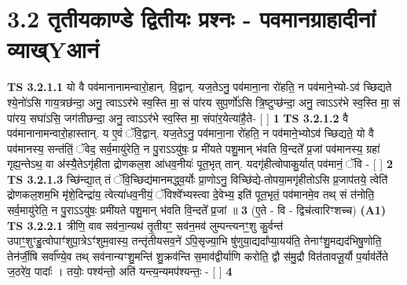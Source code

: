 \documentclass[17pt]{extarticle}
\begin{document}
     \section*{ 3.2     तृतीयकाण्डे द्वितीयः प्रश्नः - पवमानग्राहादीनां व्याख्Yआनं }
                                        \textbf{ TS 3.2.1.1} \newline
                  यो वै पव॑मानानामन्वारो॒हान्. वि॒द्वान्. यज॒तेऽनु॒ पव॑माना॒ना रो॑हति॒ न पव॑माने॒भ्यो-ऽव॑ च्छिद्यते श्ये॒नो॑ऽसि गाय॒त्रछ॑न्दा॒ अनु॒ त्वाऽऽर॑भे स्व॒स्ति मा॒ सं पा॑रय सुप॒र्णो॑ऽसि त्रि॒ष्टुप्छ॑न्दा॒ अनु॒ त्वाऽऽर॑भे स्व॒स्ति मा॒ सं पा॑रय॒ सघा॑ऽसि॒ जग॑तीछन्दा॒ अनु॒ त्वाऽऽर॑भे स्व॒स्ति मा॒ संपा॑र॒येत्या॑है॒ते- [  ] \textbf{  1} \newline
                  \newline
                                \textbf{ TS 3.2.1.2} \newline
                  वै पव॑मानानामन्वारो॒हास्तान्. य ए॒वं ॅवि॒द्वान्. यज॒तेऽनु॒ पव॑माना॒ना रो॑हति॒ न पव॑माने॒भ्योऽव॑ च्छिद्यते॒ यो वै पव॑मानस्य॒ सन्त॑तिं॒ ॅवेद॒ सर्व॒मायु॑रेति॒ न पु॒राऽऽयु॑षः॒ प्र मी॑यते पशु॒मान् भ॑वति वि॒न्दते᳚ प्र॒जां पव॑मानस्य॒ ग्रहा॑ गृह्य॒न्तेऽथ॒ वा अ॑स्यै॒तेऽगृ॑हीता द्रोणकल॒श आ॑धव॒नीयः॑ पूत॒भृत् तान्. यदगृ॑हीत्वोपाकु॒र्यात् पव॑मानं॒ ॅवि - [  ] \textbf{  2} \newline
                  \newline
                                \textbf{ TS 3.2.1.3} \newline
                  च्छि॑न्द्या॒त् तं ॅवि॒च्छिद्य॑मानमद्ध्व॒र्योः प्रा॒णोऽनु॒ विच्छि॑द्ये-तोपया॒मगृ॑हीतोऽसि प्र॒जाप॑तये॒ त्वेति॑ द्रोणकल॒शम॒भि मृ॑शे॒दिन्द्रा॑य॒ त्वेत्या॑धव॒नीयं॒ ॅविश्वे᳚भ्यस्त्वा दे॒वेभ्य॒ इति॑ पूत॒भृतं॒ पव॑मानमे॒व तथ् सं त॑नोति॒ सर्व॒मायु॑रेति॒ न पु॒राऽऽयु॑षः॒ प्रमी॑यते पशु॒मान् भ॑वति वि॒न्दते᳚ प्र॒जां ॥ \textbf{  3 } \newline
                  \newline
                      (ए॒ते - वि - द्विच॑त्वारिꣳशच्च)  \textbf{(A1)} \newline \newline
                                        \textbf{ TS 3.2.2.1} \newline
                  त्रीणि॒ वाव सव॑ना॒न्यथ॑ तृ॒तीयꣳ॒॒ सव॑न॒मव॑ लुम्पन्त्यनꣳ॒॒शु कु॒र्वन्त॑ उपाꣳ॒॒शुꣳहु॒त्वोपाꣳ॑शुपा॒त्रेऽꣳ॑शुम॒वास्य॒ तन्तृ॑तीयसव॒ने॑ ऽपि॒सृज्या॒भि षु॑णुया॒द्यदा᳚प्या॒यय॑ति॒ तेनाꣳ॑शु॒मद्यद॑भिषु॒णोति॒ तेन॑र्जी॒षि सर्वा᳚ण्ये॒व तथ् सव॑नान्यꣳशु॒मन्ति॑ शु॒क्रव॑न्ति स॒माव॑द्वीर्याणि करोति॒ द्वौ स॑मु॒द्रौ वित॑तावजू॒र्यौ प॒र्याव॑र्तेते ज॒ठरे॑व॒ पादाः᳚ । तयोः॒ पश्य॑न्तो॒ अति॑ यन्त्य॒न्यमप॑श्यन्तः॒ - [  ] \textbf{  4} \newline
\end{document}
